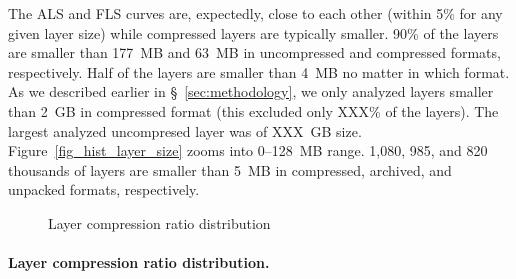 The ALS and FLS curves are, expectedly, close to each other (within 5\% for
any given layer size) while compressed layers are typically smaller.
90\% of the layers are smaller than 177~MB and 63~MB in uncompressed and
compressed formats, respectively.
%
Half of the layers are smaller than 4~MB no matter in which format.
%
As we described earlier in \S~\ref{sec:methodology}, we only
analyzed layers smaller than 2~GB in compressed format (this
excluded only XXX\% of the layers).
%
%
The largest analyzed uncompresed layer
was of XXX~GB size.
%
Figure~\ref{fig_hist_layer_size} zooms into 0--128~MB range.
%
1,080, 985, and 820 thousands of layers are smaller than 5~MB
in compressed, archived, and unpacked formats, respectively.
%


\begin{figure}[!t]
	\centering
	\caption{Layer compression ratio distribution}
	\label{fig-compression-ratio}
\end{figure}

\paragraph{Layer compression ratio distribution.}

